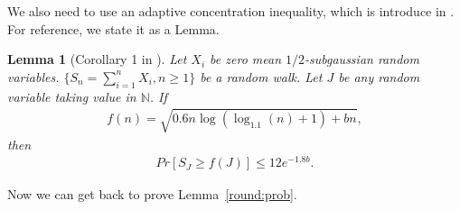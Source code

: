 \documentclass{article}
\newtheorem{lemma}{Lemma}
\begin{document}
We also need to use an adaptive concentration inequality, which is introduce in \cite{zhao2016adaptive}. For reference, we state it as a Lemma.

\begin{lemma}[Corollary 1 in \cite{zhao2016adaptive}]
Let $X_{i}$ be zero mean $1/2$-subgaussian random variables. $\{S_{n}=\sum_{i=1}^{n}X_{i},n\geq 1\}$ be a random walk. Let $J$ be any random variable taking value in $\mathbb{N}$. If
\begin{align}
f(n)=\sqrt{0.6n\log(\log_{1.1}(n)+1)+bn}, \nonumber
\end{align}
then
\begin{align}
Pr[S_{J}\geq f(J)]\leq 12e^{-1.8b}. \nonumber
\end{align}
\label{ACI-inequality}
\end{lemma}


Now we can get back to prove Lemma~\ref{round:prob}.
\end{document}
